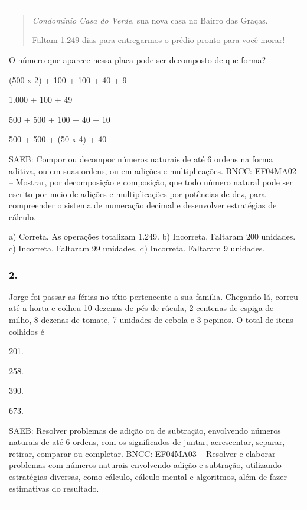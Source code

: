 \begin{mdframed}[linewidth=2pt,linecolor=salmao,roundcorner=2pt]
\begin{escolha}
{{{\begin{longtable}[]{@{}l@{}}
\begin{itemize}
{\begin{quote}
\textit{Condomínio Casa do Verde}, sua nova casa no Bairro das Graças.

Faltam 1.249 dias para entregarmos o prédio pronto para você morar!
\end{quote}

O número que aparece nessa placa pode ser decomposto de que forma?

\begin{escolha}
\item (500 x 2) + 100 + 100 + 40 + 9
\item 1.000 + 100 + 49  
\item 500 + 500 + 100 + 40 + 10  
\item 500 + 500 + (50 x 4) + 40
  
\end{escolha}

SAEB: Compor ou decompor números naturais de até 6 ordens na
forma aditiva, ou em suas ordens, ou em adições e multiplicações.
BNCC: EF04MA02 -- Mostrar, por decomposição e composição, que todo número natural pode ser escrito
por meio de adições e multiplicações por potências de dez, para compreender o sistema de
numeração decimal e desenvolver estratégias de cálculo.

a) Correta. As operações totalizam 1.249.
b) Incorreta. Faltaram 200 unidades.
c) Incorreta. Faltaram 99 unidades.
d) Incorreta. Faltaram 9 unidades.

\subsubsection{2. }

Jorge foi passar as férias no sítio pertencente a sua família. Chegando lá,
correu até a horta e colheu 10 dezenas de pés de rúcula, 2 centenas de
espiga de milho, 8 dezenas de tomate, 7 unidades de cebola e 3 pepinos.
O total de itens colhidos é

\begin{escolha}
\item
  201.
\item
  258.
\item
  390.
\item
  673.
\end{escolha}

SAEB: Resolver problemas de adição ou de subtração,
envolvendo números naturais de até 6 ordens, com os significados de
juntar, acrescentar, separar, retirar, comparar ou completar.
BNCC: EF04MA03 -- Resolver e elaborar problemas com números naturais envolvendo adição e subtração,
utilizando estratégias diversas, como cálculo, cálculo mental e algoritmos, além de fazer estimativas
do resultado.

}
\end{itemize}
\end{longtable}}}}
\end{escolha}
\end{mdframed}

